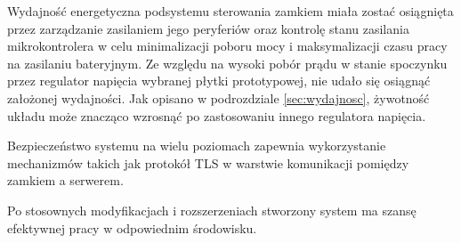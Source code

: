         Wydajność energetyczna podsystemu sterowania zamkiem miała zostać osiągnięta przez zarządzanie zasilaniem jego peryferiów oraz kontrolę stanu zasilania mikrokontrolera w celu minimalizacji poboru mocy i maksymalizacji czasu pracy na zasilaniu bateryjnym. Ze względu na wysoki pobór prądu w stanie spoczynku przez regulator napięcia wybranej płytki prototypowej, nie udało się osiągnąć założonej wydajności. Jak opisano w podrozdziale \ref{sec:wydajnosc}, żywotność układu może znacząco wzrosnąć po zastosowaniu innego regulatora napięcia.

        Bezpieczeństwo systemu na wielu poziomach zapewnia wykorzystanie mechanizmów takich jak protokół TLS w warstwie komunikacji pomiędzy zamkiem a serwerem.

        Po stosownych modyfikacjach i rozszerzeniach stworzony system ma szansę efektywnej pracy w odpowiednim środowisku.